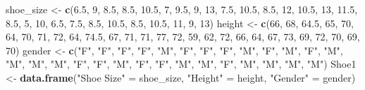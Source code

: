 \documentclass[
]{article}
\newenvironment{Shaded}{\begin{snugshade}}{\end{snugshade}}
\newcommand{\DecValTok}[1]{\textcolor[rgb]{0.00,0.00,0.81}{#1}}
\newcommand{\FloatTok}[1]{\textcolor[rgb]{0.00,0.00,0.81}{#1}}
\newcommand{\FunctionTok}[1]{\textcolor[rgb]{0.13,0.29,0.53}{\textbf{#1}}}
\newcommand{\NormalTok}[1]{#1}
\newcommand{\OtherTok}[1]{\textcolor[rgb]{0.56,0.35,0.01}{#1}}
\newcommand{\StringTok}[1]{\textcolor[rgb]{0.31,0.60,0.02}{#1}}
\begin{document}
\begin{Shaded}
\begin{Highlighting}[]
\NormalTok{shoe\_size }\OtherTok{\textless{}{-}} \FunctionTok{c}\NormalTok{(}\FloatTok{6.5}\NormalTok{, }\DecValTok{9}\NormalTok{, }\FloatTok{8.5}\NormalTok{, }\FloatTok{8.5}\NormalTok{, }\FloatTok{10.5}\NormalTok{, }\DecValTok{7}\NormalTok{, }\FloatTok{9.5}\NormalTok{, }\DecValTok{9}\NormalTok{, }\DecValTok{13}\NormalTok{, }\FloatTok{7.5}\NormalTok{, }\FloatTok{10.5}\NormalTok{, }\FloatTok{8.5}\NormalTok{, }\DecValTok{12}\NormalTok{, }\FloatTok{10.5}\NormalTok{, }\DecValTok{13}\NormalTok{, }\FloatTok{11.5}\NormalTok{, }\FloatTok{8.5}\NormalTok{, }\DecValTok{5}\NormalTok{, }\DecValTok{10}\NormalTok{, }\FloatTok{6.5}\NormalTok{, }\FloatTok{7.5}\NormalTok{, }\FloatTok{8.5}\NormalTok{, }\FloatTok{10.5}\NormalTok{, }\FloatTok{8.5}\NormalTok{, }\FloatTok{10.5}\NormalTok{, }\DecValTok{11}\NormalTok{, }\DecValTok{9}\NormalTok{, }\DecValTok{13}\NormalTok{)}
\NormalTok{height }\OtherTok{\textless{}{-}} \FunctionTok{c}\NormalTok{(}\DecValTok{66}\NormalTok{, }\DecValTok{68}\NormalTok{, }\FloatTok{64.5}\NormalTok{, }\DecValTok{65}\NormalTok{, }\DecValTok{70}\NormalTok{, }\DecValTok{64}\NormalTok{, }\DecValTok{70}\NormalTok{, }\DecValTok{71}\NormalTok{, }\DecValTok{72}\NormalTok{, }\DecValTok{64}\NormalTok{, }\FloatTok{74.5}\NormalTok{, }\DecValTok{67}\NormalTok{, }\DecValTok{71}\NormalTok{, }\DecValTok{71}\NormalTok{, }\DecValTok{77}\NormalTok{, }\DecValTok{72}\NormalTok{, }\DecValTok{59}\NormalTok{, }\DecValTok{62}\NormalTok{, }\DecValTok{72}\NormalTok{, }\DecValTok{66}\NormalTok{, }\DecValTok{64}\NormalTok{, }\DecValTok{67}\NormalTok{, }\DecValTok{73}\NormalTok{, }\DecValTok{69}\NormalTok{, }\DecValTok{72}\NormalTok{, }\DecValTok{70}\NormalTok{, }\DecValTok{69}\NormalTok{, }\DecValTok{70}\NormalTok{)}
\NormalTok{gender }\OtherTok{\textless{}{-}} \FunctionTok{c}\NormalTok{(}\StringTok{"F"}\NormalTok{, }\StringTok{"F"}\NormalTok{, }\StringTok{"F"}\NormalTok{, }\StringTok{"F"}\NormalTok{, }\StringTok{"M"}\NormalTok{, }\StringTok{"F"}\NormalTok{, }\StringTok{"F"}\NormalTok{, }\StringTok{"F"}\NormalTok{, }\StringTok{"M"}\NormalTok{, }\StringTok{"F"}\NormalTok{, }\StringTok{"M"}\NormalTok{, }\StringTok{"F"}\NormalTok{, }\StringTok{"M"}\NormalTok{, }\StringTok{"M"}\NormalTok{, }\StringTok{"M"}\NormalTok{, }\StringTok{"M"}\NormalTok{, }\StringTok{"F"}\NormalTok{, }\StringTok{"F"}\NormalTok{, }\StringTok{"M"}\NormalTok{, }\StringTok{"F"}\NormalTok{, }\StringTok{"F"}\NormalTok{, }\StringTok{"M"}\NormalTok{, }\StringTok{"M"}\NormalTok{, }\StringTok{"F"}\NormalTok{, }\StringTok{"M"}\NormalTok{, }\StringTok{"M"}\NormalTok{, }\StringTok{"M"}\NormalTok{, }\StringTok{"M"}\NormalTok{)}
\NormalTok{Shoe1 }\OtherTok{\textless{}{-}} \FunctionTok{data.frame}\NormalTok{(}\StringTok{"Shoe Size"} \OtherTok{=}\NormalTok{ shoe\_size, }\StringTok{"Height"} \OtherTok{=}\NormalTok{ height, }\StringTok{"Gender"} \OtherTok{=}\NormalTok{ gender)}


\end{Highlighting}
\end{Shaded}
\end{document}
